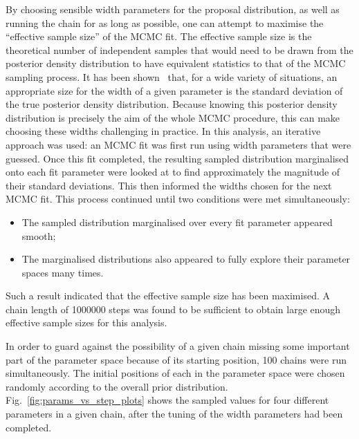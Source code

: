 By choosing sensible width parameters for the proposal distribution, as well as running the chain for as long as possible, one can attempt to maximise the ``effective sample size'' of the MCMC fit. The effective sample size is the theoretical number of independent samples that would need to be drawn from the posterior density distribution to have equivalent statistics to that of the MCMC sampling process. It has been shown~\cite{gelmanChapter11Basics2013} that, for a wide variety of situations, an appropriate size for the width of a given parameter is the standard deviation of the true posterior density distribution. %
Because knowing this posterior density distribution is precisely the aim of the whole MCMC procedure, this can make choosing these widths challenging in practice. In this analysis, an iterative approach was used: an MCMC fit was first run using width parameters that were guessed. Once this fit completed, the resulting sampled distribution marginalised onto each fit parameter were looked at to find approximately the magnitude of their standard deviations. This then informed the widths chosen for the next MCMC fit. 
This process continued until two conditions were met simultaneously:
\begin{itemize}
    \item The sampled distribution marginalised over every fit parameter appeared smooth;
    \item The marginalised distributions also appeared to fully explore their parameter spaces many times.
\end{itemize}
Such a result indicated that the effective sample size has been maximised. A chain length of \num{1000000} steps was found to be sufficient to obtain large enough effective sample sizes for this analysis.

In order to guard against the possibility of a given chain missing some important part of the parameter space because of its starting position, 100 chains were run simultaneously. The initial positions of each in the parameter space were chosen randomly according to the overall prior distribution. Fig.~\ref{fig:params_vs_step_plots} shows the sampled values for four different parameters in a given chain, after the tuning of the width parameters had been completed.

